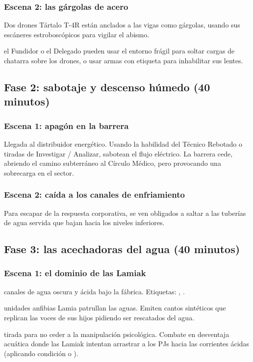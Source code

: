 \subsubsection{Escena 2: las gárgolas de acero}
Dos drones Tártalo T-4R están anclados a las vigas como gárgolas, usando sus escáneres estroboscópicos para vigilar el abismo.\par
{} el Fundidor o el Delegado pueden usar el entorno frágil para soltar cargas de chatarra sobre los drones, o usar armas con etiqueta  para inhabilitar sus lentes.

\subsection{Fase 2: sabotaje y descenso húmedo (40 minutos)}

\subsubsection{Escena 1: apagón en la barrera}
Llegada al distribuidor energético. Usando la habilidad del Técnico Rebotado o tiradas de Investigar / Analizar, sabotean el flujo eléctrico. La barrera cede, abriendo el camino subterráneo al Círculo Médico, pero provocando una sobrecarga en el sector.

\subsubsection{Escena 2: caída a los canales de enfriamiento}
Para escapar de la respuesta corporativa, se ven obligados a saltar a las tuberías de agua servida que bajan hacia los niveles inferiores.

\subsection{Fase 3: las acechadoras del agua (40 minutos)}

\subsubsection{Escena 1: el dominio de las Lamiak}
 canales de agua oscura y ácida bajo la fábrica. Etiquetas: , .\par
{} unidades anfibias Lamia patrullan las aguas. Emiten cantos sintéticos que replican las voces de sus hijos pidiendo ser rescatados del agua.\par
{} tirada para no ceder a la manipulación psicológica. Combate en desventaja acuática donde las Lamiak intentan arrastrar a los PJs hacia las corrientes ácidas (aplicando condición  o ).

